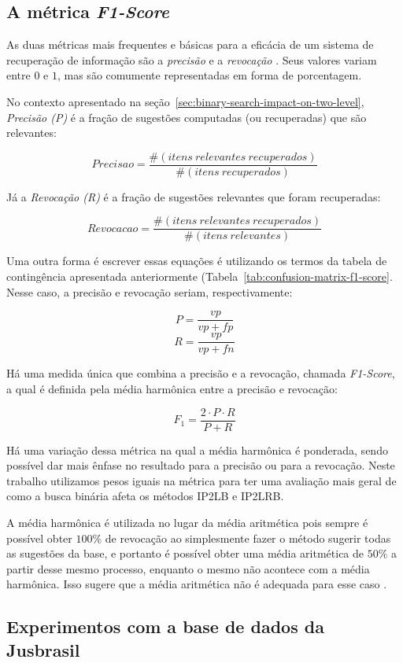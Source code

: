 \subsection{A métrica \textit{F1-Score}}

As duas métricas mais frequentes e básicas para a eficácia de um sistema de recuperação de informação são a \textit{precisão} e a \textit{revocação}  \citep{irbookchristopher}. Seus valores variam entre $0$ e $1$, mas são comumente representadas em forma de porcentagem.

No contexto apresentado na seção~\ref{sec:binary-search-impact-on-two-level}, \textit{Precisão (P)} é a fração de sugestões computadas (ou recuperadas) que são relevantes:

$$ Precisao = \frac{\#(itens\ relevantes\ recuperados)}{\#(itens\ recuperados)}$$

Já a \textit{Revocação (R)} é a fração de sugestões relevantes que foram recuperadas:

$$ Revocacao = \frac{\#(itens\ relevantes\ recuperados)}{\#(itens\ relevantes)}$$

Uma outra forma é escrever essas equações é utilizando os termos da tabela de contingência apresentada anteriormente (Tabela~\ref{tab:confusion-matrix-f1-score}. Nesse caso, a precisão e revocação seriam, respectivamente:

$$P = \frac{vp}{vp + fp}$$
$$R = \frac{vp}{vp + fn}$$

Há uma medida única que combina a precisão e a revocação, chamada \textit{F1-Score}, a qual é definida pela média harmônica entre a precisão e revocação:

$$F_{1} = \frac{2 \cdot P \cdot R}{P + R}$$

Há uma variação dessa métrica na qual a média harmônica é ponderada, sendo possível dar mais ênfase no resultado para a precisão ou para a revocação. Neste trabalho utilizamos pesos iguais na métrica para ter uma avaliação mais geral de como a busca binária afeta os métodos IP2LB e IP2LRB.

A média harmônica é utilizada no lugar da média aritmética pois sempre é possível obter $100\%$ de revocação ao simplesmente fazer o método sugerir todas as sugestões da base, e portanto é possível obter uma média aritmética de $50\%$ a partir desse mesmo processo, enquanto o mesmo não acontece com a média harmônica. Isso sugere que a média aritmética não é adequada para esse caso \citep{irbookchristopher}.

\subsection{Experimentos com a base de dados da Jusbrasil}

